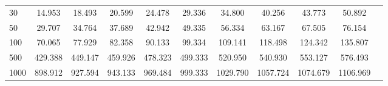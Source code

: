 \begin{tabular}{|g|c|c|c|c|c|c|c|c|c|c|}
    30                & 14.953  & 18.493  & 20.599  & 24.478  & 29.336  & 34.800   & 40.256   & 43.773   & 50.892   \\
    50                & 29.707  & 34.764  & 37.689  & 42.942  & 49.335  & 56.334   & 63.167   & 67.505   & 76.154   \\
    100               & 70.065  & 77.929  & 82.358  & 90.133  & 99.334  & 109.141  & 118.498  & 124.342  & 135.807  \\
    500               & 429.388 & 449.147 & 459.926 & 478.323 & 499.333 & 520.950  & 540.930  & 553.127  & 576.493  \\
    1000              & 898.912 & 927.594 & 943.133 & 969.484 & 999.333 & 1029.790 & 1057.724 & 1074.679 & 1106.969 \\
    \hline
\end{tabular}